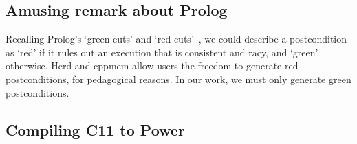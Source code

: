 \subsection{Amusing remark about Prolog}

\begin{remark}Recalling Prolog's `green cuts' and `red
cuts'~\cite{bratko86}, we could describe a postcondition as `red' if
it rules out an execution that is consistent and racy, and `green'
otherwise. Herd and cppmem allow users the freedom to generate red
postconditions, for pedagogical reasons. In our work, we must only
generate green postconditions. \end{remark}

\subsection{Compiling C11 to Power}

